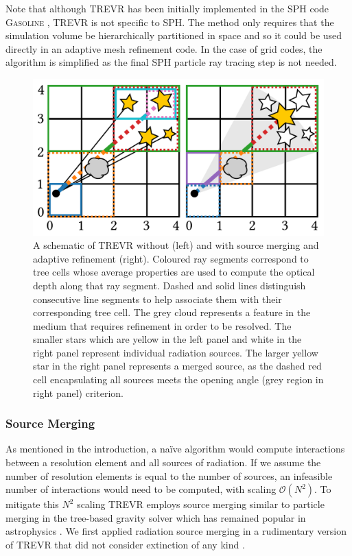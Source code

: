 \documentclass[fleq,usenatbib]{mnras}
\newcommand{\acro}{TREVR}
\newcommand{\bigO}[1]{\mathcal{O}\left(#1\right)}
\begin{document}
{Note that although \acro{} has been initially implemented in the SPH code 
\textsc{Gasoline} \citep{wadsleyEt17}, \acro{} is not specific to SPH. The 
method only requires that the simulation volume be hierarchically partitioned 
in space and so it could be used directly in an adaptive mesh refinement code. 
In the case of grid codes, the algorithm is simplified as the final SPH 
particle ray tracing step is not needed.
 
\begin{figure}
\includegraphics[width=1\linewidth]{Figures/algorithm.pdf}
\caption{A schematic of \acro{} without (left) and with source merging and 
adaptive refinement (right). Coloured ray segments correspond to tree cells 
whose average properties are used to compute the optical depth along that ray 
segment. Dashed and solid lines distinguish consecutive line segments to 
help associate them with their corresponding tree cell. The grey cloud 
represents a feature in the medium that requires refinement in order to be 
resolved. The smaller stars which are yellow in the left panel and white in 
the right panel represent individual radiation sources. The larger yellow star 
in the right panel represents a merged source, as the dashed red cell 
encapsulating all sources meets the opening angle (grey region in right panel) 
criterion.} 
\label{fig:algorithm}
\end{figure}

\subsubsection{Source Merging}
As mentioned in the introduction, a na\"ive algorithm would compute 
interactions between a resolution element and  all sources of radiation. If we 
assume the number of resolution elements is equal to the number of sources, 
an infeasible number of interactions would need to be computed, with scaling
$\bigO{N^2}$. To mitigate this $N^2$ scaling \acro{} employs source merging 
similar to particle merging in the \cite{barnesHut86} tree-based gravity 
solver which has remained popular in astrophysics 
\citep{benz88,vineSigurdsson98,springelEt01,wadsleyEt04,hubberEt11}. We first
applied radiation source merging in a rudimentary version of \acro{} 
that did not consider extinction of any kind \citep{KannanEt14}.

}
\end{document}

